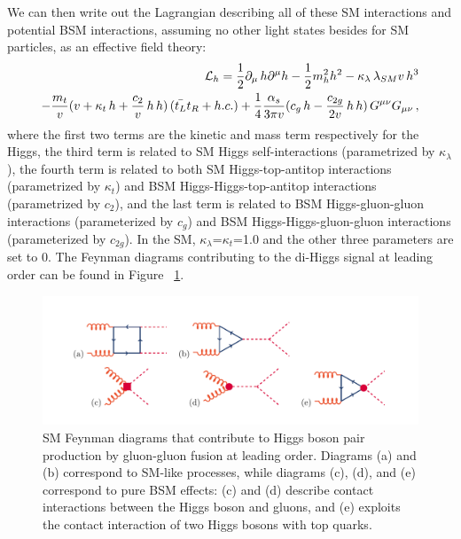 We can then write out the Lagrangian describing all of these SM interactions and potential BSM interactions, assuming no other light states besides for SM particles, as an effective field theory:
\begin{eqnarray}
{\cal L}_h = 
\frac{1}{2} \partial_{\mu}\, h \partial^{\mu} h - \frac{1}{2} m_h^2 h^2 -
  {\kappa_{\lambda}}\,  \lambda_{SM} v\, h^3 \nonumber  \\ 
- \frac{ m_t}{v}(v+   {\kappa_t} \,   h  +  \frac{c_{2}}{v}   \, h\,  h ) \,( \bar{t_L}t_R + h.c.) 
+ \frac{1}{4} \frac{\alpha_s}{3 \pi v} (   c_g \, h -  \frac{c_{2g}}{2 v} \, h\, h ) \,  G^{\mu \nu}G_{\mu\nu}\,,
\label{eq:lag}
\end{eqnarray}
where the first two terms are the kinetic and mass term respectively for the Higgs, the third term is related to SM Higgs self-interactions (parametrized by $\kappa_{\lambda}$), the fourth term is related to both SM Higgs-top-antitop interactions (parametrized by $\kappa_{t}$) and BSM Higgs-Higgs-top-antitop interactions (parametrized by $c_2$), and the last term is related to BSM Higgs-gluon-gluon interactions (parameterized by $c_g$) and BSM Higgs-Higgs-gluon-gluon interactions (parameterized by $c_{2g}$). In the SM, $\kappa_{\lambda}$=$\kappa_{t}$=1.0 and the other three parameters are set to 0. The Feynman diagrams contributing to the di-Higgs signal at leading order can be found in Figure ~\ref{fig:dia}.
\begin{figure}[h]
\centering
\includegraphics[scale=0.85]{F2/translation.pdf}
\caption{SM Feynman diagrams that contribute to Higgs boson pair production by gluon-gluon fusion at leading order. Diagrams (a) and (b) correspond to SM-like processes, while diagrams (c), (d), and (e) correspond to pure BSM effects: (c) and (d) describe contact interactions between the Higgs boson and gluons, and (e) exploits the contact interaction of two Higgs bosons with top quarks.   \label{fig:dia}}
\end{figure}

